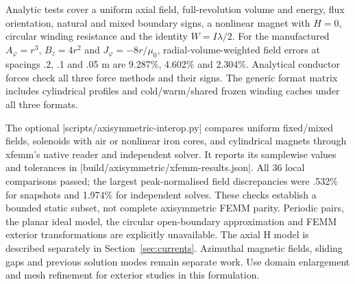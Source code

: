 Analytic tests cover a uniform axial field, full-revolution volume and energy,
flux orientation, natural and mixed boundary signs, a nonlinear magnet with
$H=0$, circular winding resistance and the identity $W=I\lambda/2$.
For the manufactured $A_\varphi=r^3$, $B_z=4r^2$ and
$J_\varphi=-8r/\mu_0$, radial-volume-weighted field errors at spacings
.2, .1 and .05 m are 9.287\%, 4.602\% and 2.304\%.
Analytical conductor forces check all three force methods and their signs.
The generic format matrix includes cylindrical profiles and cold/warm/shared
frozen winding caches under all three formats.

The optional |scripts/axisymmetric-interop.py| compares uniform fixed/mixed fields, solenoids with air or nonlinear iron cores,
and cylindrical magnets through xfemm's native reader and independent solver. It reports
its samplewise values and tolerances in |build/axisymmetric/xfemm-results.json|.
All 36 local comparisons passed; the largest peak-normalised field discrepancies
were .532\% for snapshots and 1.974\% for independent solves.
These checks establish a bounded static subset, not complete axisymmetric FEMM
parity. Periodic pairs, the planar ideal model, the circular open-boundary
approximation and FEMM exterior transformations are explicitly unavailable.
The axial H model is described separately in Section~\ref{sec:currents}.
Azimuthal magnetic fields, sliding gaps and previous
solution modes remain separate work. Use domain enlargement and mesh refinement
for exterior studies in this formulation.

